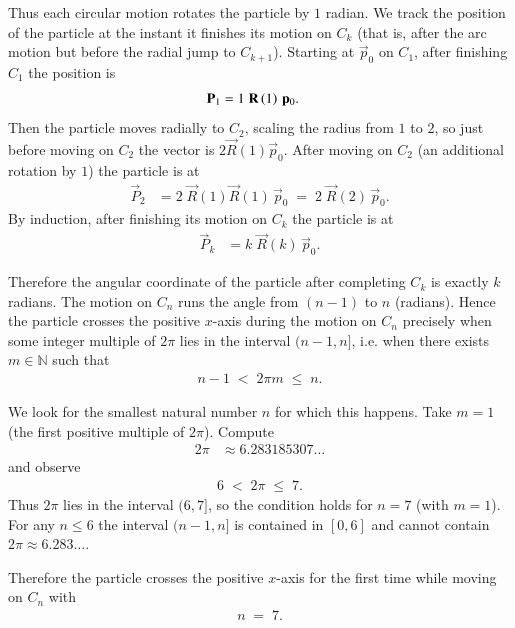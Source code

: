 \documentclass[journal]{IEEEtran}
\begin{document}
Thus each circular motion rotates the particle by $1$ radian.  We track the position of the particle at the instant it finishes its motion on $C_k$ (that is, after the arc motion but before the radial jump to $C_{k+1}$).  
Starting at $\vec{p}_0$ on $C_1$, after finishing $C_1$ the position is
\begin{align}
    \mathbf{P}_1 &= 1\;\mathbf{R}\left(1\right)\,\mathbf{p}_0.
\end{align}
Then the particle moves radially to $C_2$, scaling the radius from $1$ to $2$, so just before moving on $C_2$ the vector is $2\vec{R}(1)\vec{p}_0$. After moving on $C_2$ (an additional rotation by $1$) the particle is at
\begin{align}
    \vec{P}_2 &= 2\;\vec{R}(1)\vec{R}(1)\,\vec{p}_0 \;=\; 2\;\vec{R}(2)\,\vec{p}_0.
\end{align}
By induction, after finishing its motion on $C_k$ the particle is at
\begin{align}
    \vec{P}_k &= k\;\vec{R}(k)\,\vec{p}_0.
\end{align}

Therefore the angular coordinate of the particle after completing $C_k$ is exactly $k$ radians.
The motion on $C_n$ runs the angle from $(n-1)$ to $n$ (radians).  
Hence the particle crosses the positive $x$-axis during the motion on $C_n$ precisely when some integer multiple of $2\pi$ lies in the interval $(n-1,n]$, i.e. when there exists $m\in\mathbb{N}$ such that
\begin{align}
    n-1 \;<\; 2\pi m \;\le\; n .
\end{align}

We look for the smallest natural number $n$ for which this happens.  
Take $m=1$ (the first positive multiple of $2\pi$). Compute
\begin{align}
    2\pi &\approx 6.283185307\ldots
\end{align}
and observe
\begin{align}
    6 \;<\; 2\pi \;\le\; 7.
\end{align}
Thus $2\pi$ lies in the interval $(6,7]$, so the condition holds for $n=7$ (with $m=1$).  
For any $n\le 6$ the interval $(n-1,n]$ is contained in $[0,6]$ and cannot contain $2\pi\approx 6.283\ldots$.

Therefore the particle crosses the positive $x$-axis for the first time while moving on $C_n$ with
\begin{align}
    \boxed{n \;=\; 7.}
\end{align}
\end{document}
